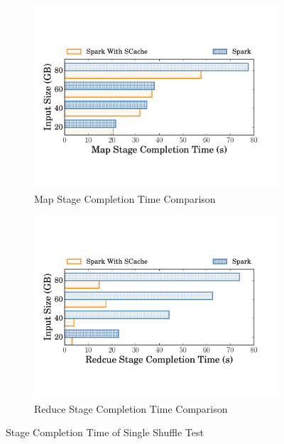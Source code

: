 \begin{figure}
	\begin{subfigure}{\linewidth}
		\centering
		\includegraphics[width=0.9\linewidth]{fig/groupbymapstage}
		\caption{Map Stage Completion Time Comparison}
		\label{fig:mapstage}
	\end{subfigure}
	\begin{subfigure}{\linewidth}
		\centering
		\includegraphics[width=0.9\linewidth]{fig/groupbyreducestage}
		\caption{Reduce Stage Completion Time Comparison}
		\label{fig:reducestage}
	\end{subfigure}
	\caption{Stage Completion Time of Single Shuffle Test}
	\label{fig:singleshuffle}
\end{figure}
